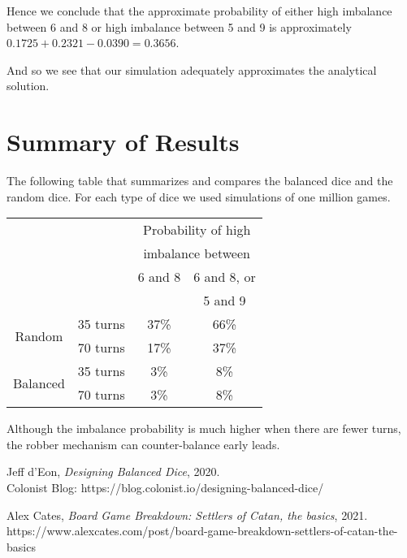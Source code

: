 \documentclass[11pt]{article}
\begin{document}
Hence we conclude that the approximate probability of either high imbalance between 6 and 8 or high imbalance between 5 and 9 is approximately $0.1725 + 0.2321 - 0.0390 = 0.3656$.

And so we see that our simulation adequately approximates the analytical solution.

\section{Summary of Results}
The following table that summarizes and compares the balanced dice and the random dice. For each type of dice we used simulations of one million games.

\begin{center}
\vspace{1cm}

	\begin{tabular}{cc|c|c|}
\cline{3-4}
&& \multicolumn{2}{|c|}{Probability of high} \\
&& \multicolumn{2}{|c|}{imbalance between} \\
\cline{3-4}
&& 6 and 8 & 6 and 8, or \\
&& & 5 and 9 \\
\hline
\multicolumn{1}{|c}{\multirow{2}{*}{Random}} & 
\multicolumn{1}{|c|}{35 turns} & 37\% & 66\% \\
\cline{2-4}
\multicolumn{1}{|c}{\multirow{2}{*}{}} 
& \multicolumn{1}{|c|}{70 turns} & 17\% & 37\% \\
\hline
\multicolumn{1}{|c}{\multirow{2}{*}{Balanced}} & 
\multicolumn{1}{|c|}{35 turns} & 3\% & 8\% \\
\cline{2-4} 
\multicolumn{1}{|c}{\multirow{2}{*}{}} 
& \multicolumn{1}{|c|}{70 turns} & 3\% & 8\% \\
\hline
\end{tabular}
\end{center}
Although the imbalance probability is much higher when there are fewer turns, the robber mechanism can counter-balance early leads.


\begin{thebibliography}{9}

  Jeff d'Eon, \textit{Designing Balanced Dice}, 2020.\\
  Colonist Blog:
  https://blog.colonist.io/designing-balanced-dice/
 
 Alex Cates, \textit{Board Game Breakdown: Settlers of Catan, the basics}, 2021. \\
 https://www.alexcates.com/post/board-game-breakdown-settlers-of-catan-the-basics
  
\end{thebibliography}
\end{document}
